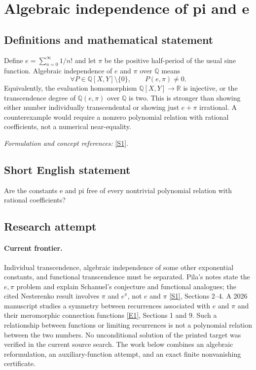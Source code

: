 \documentclass[11pt,a4paper]{article}
\newcommand{\Q}{\mathbb{Q}}
\newcommand{\R}{\mathbb{R}}
\newcommand{\sref}[2]{\hyperlink{source:#1:#2}{[S#2]}}
\newcommand{\eref}[2]{\hyperlink{extra:#1:#2}{[E#2]}}
\newif\ifshowcatalogue
\newcommand{\cataloguescope}[1]{\ifshowcatalogue
 \paragraph{Exact scope in the supplied catalogue.}
 \begin{quote}\small #1\end{quote}\fi}
\numberwithin{equation}{section}
\begin{document}
\setcounter{section}{0}
\clearpage
\section*{\texorpdfstring{Algebraic independence of pi and e}{Algebraic independence of pi and e}}\label{statement}
\subsection{Definitions and mathematical statement}
Define $e=\sum_{n=0}^{\infty}1/n!$ and let $\pi$ be the positive half-period of the usual sine function. Algebraic independence of $e$ and $\pi$ over $\Q$ means
\[
 \forall P\in\Q[X,Y]\setminus\{0\},\qquad P(e,\pi)\ne0.
\]
Equivalently, the evaluation homomorphism $\Q[X,Y]\to\R$ is injective, or the transcendence degree of $\Q(e,\pi)$ over $\Q$ is two. This is stronger than showing either number individually transcendental or showing just $e+\pi$ irrational. A counterexample would require a nonzero polynomial relation with rational coefficients, not a numerical near-equality.
\par\smallskip\textit{Formulation and concept references:} \sref{statement}{1}.
\cataloguescope{Prove that no nonzero polynomial P in Q[X,Y] satisfies P(e,pi)=0.}
\subsection{Short English statement}
Are the constants e and pi free of every nontrivial polynomial relation with rational coefficients?
\subsection{Research attempt}

\paragraph{Current frontier.}
Individual transcendence, algebraic independence of some other
exponential constants, and functional transcendence must be separated.
Pila's notes state the $e,\pi$ problem and explain Schanuel's conjecture
and functional analogues; the cited Nesterenko result involves
$\pi$ and $e^\pi$, not $e$ and $\pi$ \sref{statement}{1}, Sections 2--4.
A 2026 manuscript studies a symmetry between recurrences associated
with $e$ and $\pi$ and their meromorphic connection functions
\eref{statement}{1}, Sections 1 and 9. Such a relationship between functions
or limiting recurrences is not a polynomial relation between the two
numbers. No unconditional solution of the printed target was verified
in the current source search. The work below combines an algebraic
reformulation, an auxiliary-function attempt, and an exact finite
nonvanishing certificate.
\end{document}
